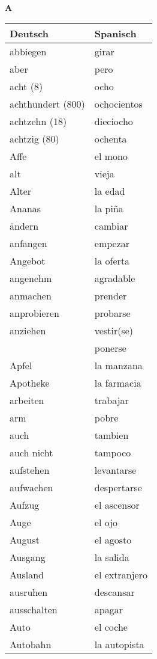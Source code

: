 \begin{flushright}\begin{Huge}\textbf{A}\end{Huge}\end{flushright}

\begin{longtable}{p{} p{}} 
\textbf{Deutsch}     & \textbf{Spanisch}                                       \\ \hline
\hline
\endhead %
abbiegen & girar\\
aber & pero\\
acht (8) & ocho\\
achthundert (800) & ochocientos\\
achtzehn (18) & dieciocho\\
achtzig (80) & ochenta\\
Affe & el mono\\
alt & vieja\\
Alter & la edad\\
Ananas & la piña\\
ändern & cambiar\\
anfangen & empezar\\
Angebot & la oferta \\
angenehm & agradable\\
anmachen & prender\\
anprobieren & probarse\\
anziehen & vestir(se)\\
~ & ponerse\\
Apfel & la manzana \\
Apotheke & la farmacia\\
arbeiten & trabajar\\
arm & pobre\\
auch & tambien\\
auch nicht & tampoco\\
aufstehen & levantarse\\
aufwachen & despertarse\\
Aufzug & el ascensor\\
Auge & el ojo\\
August & el agosto\\
Ausgang & la salida\\
Ausland & el extranjero\\
ausruhen & descansar\\
ausschalten & apagar\\
Auto & el coche \\
Autobahn & la autopista\\
\end{longtable}
